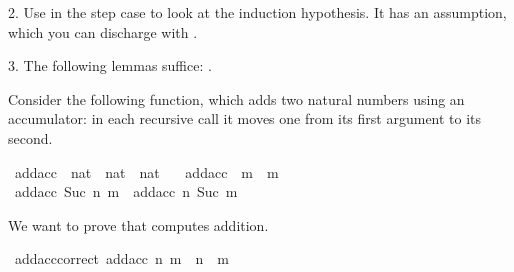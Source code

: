 \begin{isabellebody}
\begin{isamarkuptext}
 2. Use  in the step case to look at the induction hypothesis. It has an assumption,
    which you can discharge with .

 3. The following lemmas suffice: .%
\end{isamarkuptext}\isamarkuptrue%
%
\isadelimproof
%
\endisadelimproof
%
\isatagproof
%
\endisatagproof
{\isafoldproof}%
%
\isadelimproof
%
\endisadelimproof
%
\begin{isamarkuptext}%
%
\end{isamarkuptext}\isamarkuptrue%
%
\begin{isamarkuptext}%
Consider the following function, which adds two natural numbers using an accumulator: in
      each recursive call it moves one  from its first argument to its second.%
\end{isamarkuptext}\isamarkuptrue%
\isamarkupfalse%
\ add{\isacharunderscore}{\kern0pt}acc\ {\isacharcolon}{\kern0pt}{\isacharcolon}{\kern0pt}\ {\isachardoublequoteopen}nat\ {\isasymRightarrow}\ nat\ {\isasymRightarrow}\ nat{\isachardoublequoteclose}\ \isanewline
\ \ {\isachardoublequoteopen}add{\isacharunderscore}{\kern0pt}acc\ {}\ m\ {\isacharequal}{\kern0pt}\ m{\isachardoublequoteclose}\isanewline
{\isacharbar}{\kern0pt}\ {\isachardoublequoteopen}add{\isacharunderscore}{\kern0pt}acc\ {\isacharparenleft}{\kern0pt}Suc\ n{\isacharparenright}{\kern0pt}\ m\ {\isacharequal}{\kern0pt}\ add{\isacharunderscore}{\kern0pt}acc\ n\ {\isacharparenleft}{\kern0pt}Suc\ m{\isacharparenright}{\kern0pt}{\isachardoublequoteclose}%
\begin{isamarkuptext}%
We want to prove that  computes addition.%
\end{isamarkuptext}\isamarkuptrue%
\isamarkupfalse%
\ add{\isacharunderscore}{\kern0pt}acc{\isacharunderscore}{\kern0pt}correct{\isacharcolon}{\kern0pt}\ {\isachardoublequoteopen}add{\isacharunderscore}{\kern0pt}acc\ n\ m\ {\isacharequal}{\kern0pt}\ n\ {\isacharplus}{\kern0pt}\ m{\isachardoublequoteclose}%
\begin{isamarkuptext}%

\end{isamarkuptext}
\end{isabellebody}
